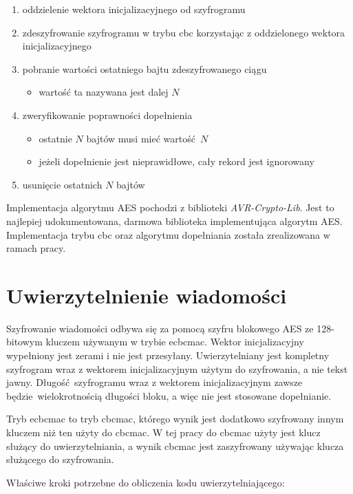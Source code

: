 \begin{enumerate}
\item oddzielenie wektora inicjalizacyjnego od szyfrogramu
\item zdeszyfrowanie szyfrogramu w trybu \gls{cbc} korzystając z oddzielonego wektora inicjalizacyjnego
\item pobranie wartości ostatniego bajtu zdeszyfrowanego ciągu
\begin{itemize}
    \item wartość ta nazywana jest dalej $ N $
\end{itemize}
\item zweryfikowanie poprawności dopełnienia
\begin{itemize}
\item ostatnie $ N $ bajtów musi mieć wartość $ N $
\item jeżeli dopełnienie jest nieprawidłowe, cały rekord jest ignorowany
\end{itemize}
\item usunięcie ostatnich $ N $ bajtów
\end{enumerate}

Implementacja algorytmu AES pochodzi z biblioteki \emph{AVR-Crypto-Lib}. Jest to najlepiej udokumentowana, darmowa biblioteka implementująca algorytm AES. Implementacja trybu \gls{cbc} oraz algorytmu dopełniania została zrealizowana w ramach pracy.

\section{Uwierzytelnienie wiadomości}
\label{sec:auth}

Szyfrowanie wiadomości odbywa się za pomocą szyfru blokowego AES ze 128-bitowym kluczem używanym w trybie \gls{ecbcmac}. Wektor inicjalizacyjny wypełniony jest zerami i nie jest przesyłany. Uwierzytelniany jest kompletny szyfrogram wraz z wektorem inicjalizacyjnym użytym do szyfrowania, a nie tekst jawny. Długość szyfrogramu wraz z wektorem inicjalizacyjnym zawsze będzie wielokrotnością długości bloku, a więc nie jest stosowane dopełnianie.

Tryb \gls{ecbcmac} to tryb \gls{cbcmac}, którego wynik jest dodatkowo szyfrowany innym kluczem niż ten użyty do \gls{cbcmac}. W tej pracy do \gls{cbcmac} użyty jest klucz służący do uwierzytelniania, a wynik \gls{cbcmac} jest zaszyfrowany używając klucza służącego do szyfrowania.

Właściwe kroki potrzebne do obliczenia kodu uwierzytelniającego:

